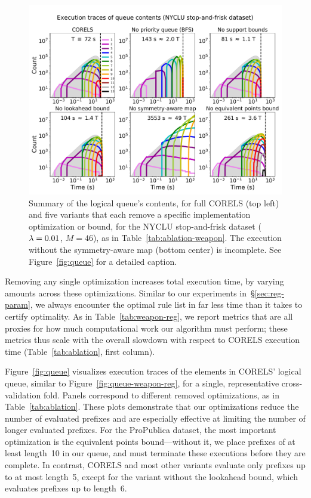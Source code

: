 %
\begin{figure}[t!]
\begin{center}
\includegraphics[trim={0mm 0mm 0mm 15mm}, width=\textwidth]{figs/weapon_ablation-queue.pdf}
\end{center}
\vspace{-5mm}
\caption{Summary of the logical queue's contents, for full CORELS (top left)
and five variants that each remove a specific implementation optimization or bound,
for the NYCLU stop-and-frisk dataset (${{\lambda} = 0.01}$, ${M = 46}$), as in Table~\ref{tab:ablation-weapon}.
The execution without the symmetry-aware map (bottom center) is incomplete.
%
See Figure~\ref{fig:queue} for a detailed caption.
}
\label{fig:queue-weapon}
\end{figure}

Removing any single optimization increases total execution time,
by varying amounts across these optimizations.
%
Similar to our experiments in~\S\ref{sec:reg-param}, we always encounter the
optimal rule list in far less time than it takes to certify optimality.
%
As in Table~\ref{tab:weapon-reg}, we report metrics that are all proxies
for how much computational work our algorithm must perform;
these metrics thus scale with the overall slowdown with respect to CORELS execution time
(Table~\ref{tab:ablation}, first column).

Figure~\ref{fig:queue} visualizes execution traces of the elements in CORELS' logical queue,
similar to Figure~\ref{fig:queue-weapon-reg},
for a single, representative cross-validation fold.
%
Panels correspond to different removed optimizations, as in Table~\ref{tab:ablation}.
%
These plots demonstrate that our optimizations reduce the number of evaluated prefixes
and are especially effective at limiting the number of longer evaluated prefixes.
%
For the ProPublica dataset, the most important optimization is the equivalent points
bound---without it, we place prefixes of at least length~10 in our queue,
and must terminate these executions before they are complete.
%
In contrast, CORELS and most other variants evaluate only prefixes up to at most length~5,
except for the variant without the lookahead bound, which evaluates prefixes up to length~6.

